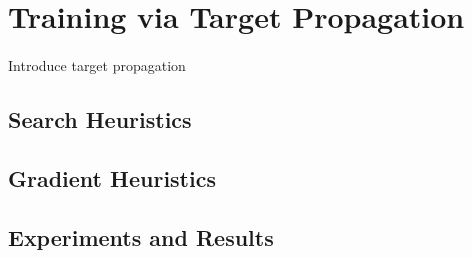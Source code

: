 \section{Training via Target Propagation}

\paragraph{}
Introduce target propagation 

\subsection{Search Heuristics}

\subsection{Gradient Heuristics}

\subsection{Experiments and Results}